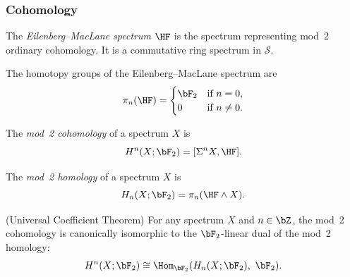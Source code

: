 \subsubsection{Cohomology}\label{sec:prereq-cohomology}

\begin{axiom}\label{prereq:ax:eilenberg-maclane}
    \leanok
    The \emph{Eilenberg--MacLane spectrum} $\HF$ is the spectrum representing mod~2 ordinary cohomology. It is a commutative ring spectrum in $\mathcal{S}$.
\end{axiom}

\begin{axiom}\label{prereq:ax:eilenberg-maclane-homotopy}
    \leanok
    The homotopy groups of the Eilenberg--MacLane spectrum are
    $$\pi_n(\HF) = \begin{cases} \bF_2 & \text{if } n = 0, \\ 0 & \text{if } n \neq 0.\end{cases}$$
\end{axiom}

\begin{definition}\label{prereq:def:mod2-cohomology}
    \leanok
    The \emph{mod~2 cohomology} of a spectrum $X$ is
    $$H^n(X; \bF_2) = [\Sigma^n X, \HF].$$
\end{definition}

\begin{definition}\label{prereq:def:mod2-homology}
    \leanok
    The \emph{mod~2 homology} of a spectrum $X$ is
    $$H_n(X; \bF_2) = \pi_n(\HF \wedge X).$$
\end{definition}

\begin{axiom}\label{prereq:ax:universal-coefficient}
    \leanok
    (Universal Coefficient Theorem) For any spectrum $X$ and $n \in \bZ$, the mod~2 cohomology is canonically isomorphic to the $\bF_2$-linear dual of the mod~2 homology:
    $$H^n(X; \bF_2) \cong \Hom_{\bF_2}(H_n(X; \bF_2),\ \bF_2).$$
\end{axiom}

